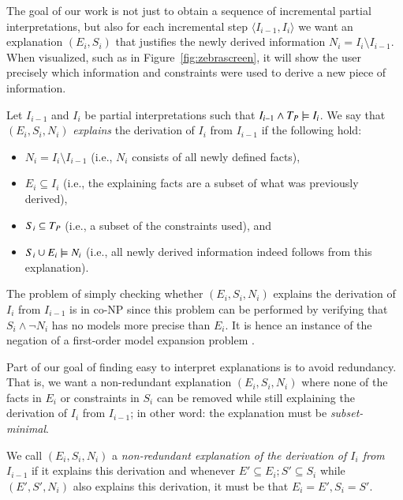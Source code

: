 The goal of our work is not just to obtain a sequence of incremental partial interpretations, but also for each incremental step $\langle I_{i-1}, I_i \rangle$ we want an explanation $(E_i,S_i)$ that justifies the newly derived information $N_i = I_i \setminus I_{i-1}$. When visualized, such as in Figure~\ref{fig:zebrascreen}, it will show the user precisely which information and constraints were used to derive a new piece of information.

\begin{definition}
 Let $I_{i-1}$ and $I_i$ be partial interpretations such that $I_{i-1}\land T_P \models I_i$.
 We say that $(E_i,S_i,N_i)$ \emph{explains} the derivation of $I_{i}$ from $I_{i-1}$ if the following hold:
\begin{itemize}
    \item $N_i= I_i \setminus I_{i-1}$ (i.e., $N_i$ consists of all newly defined facts), 
	\item $E_i\subseteq I_i$ (i.e., the explaining facts are a subset of what was previously derived),
	\item $S_i \subseteq T_P$ (i.e., a subset of the constraints used), and 
	\item $S_i \cup E_i \models N_i$ (i.e., all newly derived information indeed follows from this explanation).
\end{itemize}
\end{definition}

The problem of simply checking whether $(E_i,S_i,N_i)$ explains the derivation of $I_{i}$ from $I_{i-1}$ is in co-NP since this problem can be performed by verifying that $S_i \land \lnot N_i$ has no models more precise than $E_i$. It is hence an instance of the negation of a first-order model expansion problem \cite{DBLP:conf/lpar/KolokolovaLMT10}.

Part of our goal of finding easy to interpret explanations is to avoid redundancy. 
That is, we want a non-redundant explanation $(E_i,S_i,N_i)$ where none of the facts in $E_i$ or constraints in $S_i$ can be removed while still explaining the derivation of $I_i$ from $I_{i-1}$; in other word: the explanation must be \textit{subset-minimal}. 
\begin{definition}
 We call $(E_i,S_i,N_i)$ a \emph{non-redundant explanation of  the derivation of $I_i$ from $I_{i-1}$} if it explains this derivation and whenever $E'\subseteq E_i; S'\subseteq S_i$ while $(E',S',N_i)$ also explains this derivation, it must be that $E_i=E', S_i=S'$. 
\end{definition}


